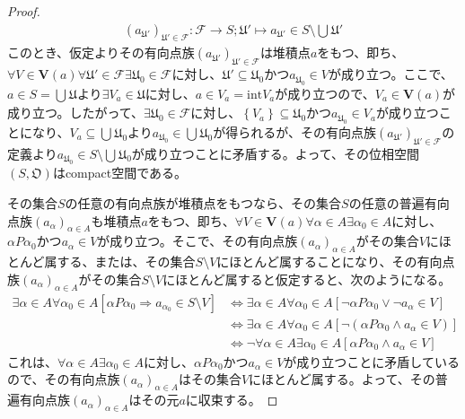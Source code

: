 \documentclass[dvipdfmx]{jsarticle}
\begin{document}
\begin{proof}
\begin{align*}
\left( a_{\mathfrak{U}'} \right)_{\mathfrak{U}'\in \mathcal{F}}\mathcal{:F \rightarrow}S;\mathfrak{U}' \mapsto a_{\mathfrak{U}'} \in S \setminus \bigcup_{} \mathfrak{U}'
\end{align*}
このとき、仮定よりその有向点族$\left( a_{\mathfrak{U}'} \right)_{\mathfrak{U}'\in \mathcal{F}}$は堆積点$a$をもつ、即ち、$\forall V \in \mathbf{V}(a)\forall\mathfrak{U}'\in \mathcal{F\exists}\mathfrak{U}_{0}\in \mathcal{F}$に対し、$\mathfrak{U}' \subseteq \mathfrak{U}_{0}$かつ$a_{\mathfrak{U}_{0}} \in V$が成り立つ。ここで、$a \in S = \bigcup_{} \mathfrak{U}$より$\exists V_{a}\in \mathfrak{U}$に対し、$a \in V_{a} = {\mathrm{int}}V_{a}$が成り立つので、$V_{a} \in \mathbf{V}(a)$が成り立つ。したがって、$\exists\mathfrak{U}_{0}\in \mathcal{F}$に対し、$\left\{ V_{a} \right\} \subseteq \mathfrak{U}_{0}$かつ$a_{\mathfrak{U}_{0}} \in V_{a}$が成り立つことになり、$V_{a} \subseteq \bigcup_{} \mathfrak{U}_{0}$より$a_{\mathfrak{U}_{0}} \in \bigcup_{} \mathfrak{U}_{0}$が得られるが、その有向点族$\left( a_{\mathfrak{U}'} \right)_{\mathfrak{U}'\in \mathcal{F}}$の定義より$a_{\mathfrak{U}_{0}} \in S \setminus \bigcup_{} \mathfrak{U}_{0}$が成り立つことに矛盾する。よって、その位相空間$\left( S,\mathfrak{O} \right)$はcompact空間である。\par
その集合$S$の任意の有向点族が堆積点をもつなら、その集合$S$の任意の普遍有向点族$\left( a_{\alpha} \right)_{\alpha \in A}$も堆積点$a$をもつ、即ち、$\forall V \in \mathbf{V}(a)\forall\alpha \in A\exists\alpha_{0} \in A$に対し、$\alpha P\alpha_{0}$かつ$a_{\alpha} \in V$が成り立つ。そこで、その有向点族$\left( a_{\alpha} \right)_{\alpha \in A}$がその集合$V$にほとんど属する、または、その集合$S \setminus V$にほとんど属することになり、その有向点族$\left( a_{\alpha} \right)_{\alpha \in A}$がその集合$S \setminus V$にほとんど属すると仮定すると、次のようになる。
\begin{align*}
\exists\alpha \in A\forall\alpha_{0} \in A\left[ \alpha P\alpha_{0} \Rightarrow a_{\alpha_{0}} \in S \setminus V \right] &\Leftrightarrow \exists\alpha \in A\forall\alpha_{0} \in A\left[ \neg\alpha P\alpha_{0} \vee \neg a_{\alpha} \in V \right]\\
&\Leftrightarrow \exists\alpha \in A\forall\alpha_{0} \in A\left[ \neg\left( \alpha P\alpha_{0} \land a_{\alpha} \in V \right) \right]\\
&\Leftrightarrow \neg\forall\alpha \in A\exists\alpha_{0} \in A\left[ \alpha P\alpha_{0} \land a_{\alpha} \in V \right]
\end{align*}
これは、$\forall\alpha \in A\exists\alpha_{0} \in A$に対し、$\alpha P\alpha_{0}$かつ$a_{\alpha} \in V$が成り立つことに矛盾しているので、その有向点族$\left( a_{\alpha} \right)_{\alpha \in A}$はその集合$V$にほとんど属する。よって、その普遍有向点族$\left( a_{\alpha} \right)_{\alpha \in A}$はその元$a$に収束する。\par

\end{proof}
\end{document}
